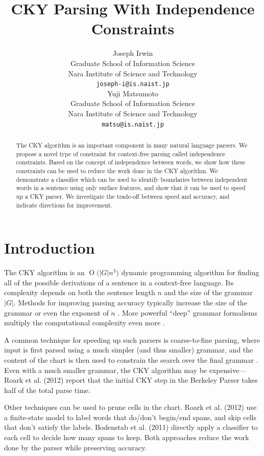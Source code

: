 \documentclass[11pt]{article}
\title{CKY Parsing With Independence Constraints}
\author{Joseph Irwin \\
  Graduate School of Information Science\hspace{1em} \\
  Nara Institute of Science and Technology\hspace{1em} \\
  {\tt joseph-i@is.naist.jp} \\\And
  Yuji Matsumoto \\
  Graduate School of Information Science \\
  Nara Institute of Science and Technology \\
  {\tt matsu@is.naist.jp} \\}
\newcommand{\BigO}[1]{\ensuremath{\operatorname{O}\bigl(#1\bigr)}}
\begin{document}
\maketitle

\begin{abstract}
The CKY algorithm is an important component in many natural language
parsers. We propose a novel type of constraint for context-free
parsing called independence constraints. Based on the concept
of independence between words, we show how these constraints can be
used to reduce the work done in the CKY algorithm. We demonstrate a
classifier which can be used to identify boundaries between
independent words in a sentence using only surface features, and show
that it can be used to speed up a CKY parser. We investigate the
trade-off between speed and accuracy, and indicate directions for
improvement.
\end{abstract}

\section{Introduction}
\label{sec-1}



The CKY algorithm is an \BigO{|G|n^3} dynamic programming
algorithm for finding all of the possible derivations of a sentence in
a context-free language. Its complexity depends on both the sentence
length $n$ and the size of the grammar $|G|$. Methods for improving
parsing accuracy typically increase the size of the grammar 
\cite{Klein2003,Petrov2007} or even the exponent of $n$ \cite{Eisner1999}. 
More powerful “deep” grammar formalisms multiply the computational
complexity even more \cite{Bangalore1999}.

A common technique for speeding up such parsers is coarse-to-fine
parsing, where input is first parsed using a much simpler (and thus
smaller) grammar, and the content of the chart is then used to
constrain the search over the final grammar
\cite{Torisawa2000,Charniak2005,Petrov2007}. Even with a much smaller
grammar, the CKY algorithm may be expensive---Roark et al. (2012)
report that the initial CKY step in the Berkeley Parser takes half of
the total parse time.

Other techniques can be used to prune cells in the chart. Roark et al.
(2012) use a finite-state model to label words that do/don't begin/end
spans, and skip cells that don't satisfy the labels. Bodenstab et al.
(2011) directly apply a classifier to each cell to decide how many
spans to keep. Both approaches reduce the work done by the parser
while preserving accuracy.
\end{document}
